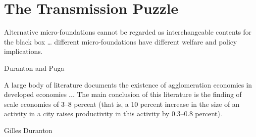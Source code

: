 \chapter{The Transmission Puzzle} \label{chapter-tramsmission}%



\epigraph{Alternative micro-foundations cannot be regarded as interchangeable contents for the black box \dots %
different micro-foundations have different welfare and policy implications. %
}{Duranton and Puga \cite{durantonMicroFoundationsUrbanAgglomeration2004}}

\epigraph{A large body of literature documents the existence of agglomeration economies in developed economies ... The main conclusion of this literature is the finding of scale economies of 3--8 percent (that is, a 10 percent increase in the size of an activity in a city raises productivity in this activity by 0.3--0.8 percent).}{Gilles Duranton \cite{durantonAreCitiesEngines2009}} %







